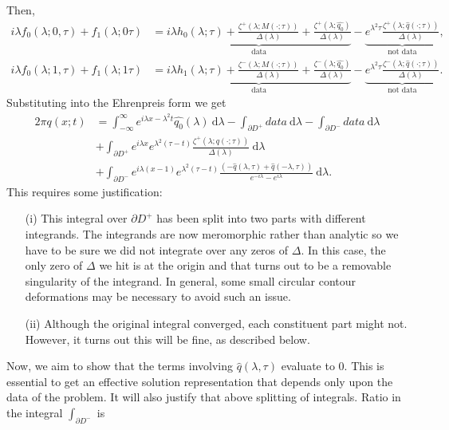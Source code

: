 Then, 
\begin{align*}
i \lambda f_0( \lambda; 0, \tau) + f_1(\lambda; 0 \tau) &=\underbrace{i \lambda h_0(\lambda; \tau) + \frac{\zeta^+ (\lambda; M(\cdot; \tau)) }{\Delta (\lambda)} + \frac{\zeta^+ (\lambda; \widehat{q_0}) }{\Delta (\lambda)}}_\text{data} - \underbrace{e^{\lambda^2 \tau} \frac{\zeta^+ (\lambda; \widehat{q}(\cdot; \tau))}{\Delta (\lambda)}}_\text{not data}, \\
i \lambda f_0( \lambda; 1, \tau) + f_1(\lambda; 1 \tau) &= \underbrace{i \lambda h_1(\lambda; \tau) + \frac{\zeta^- (\lambda; M(\cdot; \tau)) }{\Delta (\lambda)} + \frac{\zeta^- (\lambda; \widehat{q_0}) }{\Delta (\lambda)}}_\text{data}  - \underbrace{e^{\lambda^2 \tau} \frac{\zeta^- (\lambda; \widehat{q}(\cdot; \tau))}{\Delta (\lambda)}}_\text{not data}.
\end{align*}
Substituting into the Ehrenpreis form we get 
\begin{align*}
2 \pi q(x;t) &= \int^{\infty}_{-\infty} e^{i\lambda x - \lambda^2 t} \widehat{q_0}(\lambda) ~\mathrm{d}\lambda -  \int_{\partial D^+} data ~\mathrm{d}\lambda -  \int_{\partial D^-} data ~\mathrm{d}\lambda \\
&+ \int_{\partial D^+} e^{i\lambda x} e^{\lambda^2(\tau - t)}\frac{\zeta^+ (\lambda; \widehat{q}(\cdot; \tau))}{\Delta (\lambda)} ~\mathrm{d}\lambda \\
&+ \int_{\partial D^-} e^{i\lambda(x-1)} e^{\lambda^2(\tau - t)}\frac{(- \widehat{q}(\lambda, \tau) + \widehat{q}(-\lambda, \tau))}{e^{-i\lambda} - e^{i \lambda}} ~\mathrm{d}\lambda.
\end{align*}
This requires some justification:
\begin{enumerate}
\item[(i)] This integral over $\partial D^+$ has been split into two parts with different integrands. The integrands are now meromorphic rather than analytic so we have to be sure we did not integrate over any zeros of $\Delta.$ In this case, the only zero of $\Delta$ we hit is at the origin and that turns out to be a removable singularity of the integrand. In general, some small circular contour deformations may be necessary to avoid such an issue. 
\item[(ii)] Although the original integral converged, each constituent part might not. However, it turns out this will be fine, as described below.
\end{enumerate}
Now, we aim to show that the terms involving $\widehat{q}(\lambda, \tau)$ evaluate to $0.$ This is essential to get an effective solution representation that depends only upon the data of the problem. It will also justify that above splitting of integrals. Ratio in the integral $\displaystyle\int_{\partial D^-}$ is 
